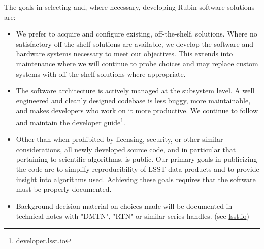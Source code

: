The goals in selecting and, where necessary, developing Rubin software solutions are:

\begin{itemize}
\item   We prefer to acquire and configure existing, off-the-shelf, solutions. Where no satisfactory off-the-shelf solutions are available, we develop the software and hardware systems necessary to meet our objectives.
This extends into maintenance where we will continue to probe choices and may replace custom systems with off-the-shelf solutions where appropriate.
\item The software architecture is actively managed at the subsystem level. A well engineered and cleanly designed codebase is less buggy, more maintainable, and makes developers who work on it more productive. We continue to follow and maintain the developer guide\footnote{\url{developer.lsst.io}}.
\item  Other than when prohibited by licensing, security, or other similar considerations, all newly developed source code, and in particular that pertaining to scientific algorithms, is public.
Our primary goals in publicizing the code are to simplify reproducibility of LSST data products and to provide insight into algorithms used.
Achieving these goals requires that the software must be properly documented.
\item Background decision material on choices made will be documented in technical notes with "DMTN", "RTN" or similar series handles. (see \url{lsst.io})
\end{itemize}
